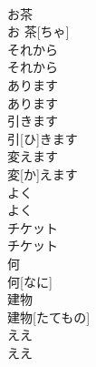 \documentclass[8pt]{extreport}
\begin{document}
\begin{CJK}{UTF8}{min}
\\	お茶	
\\	お 茶[ちゃ]	
\\	それから	
\\	それから	
\\	あります	
\\	あります	
\\	引きます	
\\	引[ひ]きます	
\\	変えます	
\\	変[か]えます	
\\	よく	
\\	よく	
\\	チケット	
\\	チケット	
\\	何	
\\	何[なに]	
\\	建物	
\\	建物[たてもの]	
\\	ええ	
\\	ええ	
\end{CJK}
\end{document}
